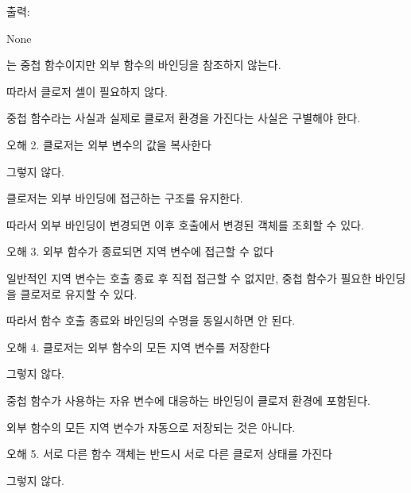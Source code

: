 출력:

\begin{dhkzsh}
None
\end{dhkzsh}

는 중첩 함수이지만 외부 함수의 바인딩을 참조하지 않는다.

따라서 클로저 셀이 필요하지 않다.

중첩 함수라는 사실과 실제로 클로저 환경을 가진다는 사실은 구별해야 한다.

\begin{dhknote}
\begin{dhksmry}[centered]
오해 2. 클로저는 외부 변수의 값을 복사한다
\end{dhksmry}
\end{dhknote}

그렇지 않다.

클로저는 외부 바인딩에 접근하는 구조를 유지한다.

따라서 외부 바인딩이 변경되면 이후 호출에서 변경된 객체를 조회할 수 있다.

\begin{dhknote}
\begin{dhksmry}[centered]
오해 3. 외부 함수가 종료되면 지역 변수에 접근할 수 없다
\end{dhksmry}
\end{dhknote}

일반적인 지역 변수는 호출 종료 후 직접 접근할 수 없지만, 중첩 함수가 필요한 바인딩을 클로저로 유지할 수 있다.

따라서 함수 호출 종료와 바인딩의 수명을 동일시하면 안 된다.

\begin{dhknote}
\begin{dhksmry}[centered]
오해 4. 클로저는 외부 함수의 모든 지역 변수를 저장한다
\end{dhksmry}
\end{dhknote}

그렇지 않다.

중첩 함수가 사용하는 자유 변수에 대응하는 바인딩이 클로저 환경에 포함된다.

외부 함수의 모든 지역 변수가 자동으로 저장되는 것은 아니다.

\begin{dhknote}
\begin{dhksmry}[centered]
오해 5. 서로 다른 함수 객체는 반드시
서로 다른 클로저 상태를 가진다
\end{dhksmry}
\end{dhknote}

그렇지 않다.

